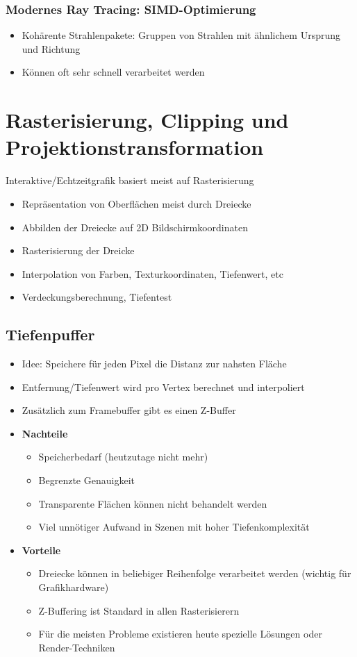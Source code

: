 \subsubsection{Modernes Ray Tracing: SIMD-Optimierung}
\begin{itemize}
	\item Kohärente Strahlenpakete: Gruppen von Strahlen mit ähnlichem Ursprung und Richtung
	\item Können oft sehr schnell verarbeitet werden
\end{itemize}



\section{Rasterisierung, Clipping und Projektionstransformation}
Interaktive/Echtzeitgrafik basiert meist auf Rasterisierung
\begin{itemize}
	\item Repräsentation von Oberflächen meist durch Dreiecke
	\item Abbilden der Dreiecke auf 2D Bildschirmkoordinaten
	\item Rasterisierung der Dreicke
	\item Interpolation von Farben, Texturkoordinaten, Tiefenwert, etc
	\item Verdeckungsberechnung, Tiefentest
\end{itemize}


\subsection{Tiefenpuffer}
\begin{itemize}
	\item Idee: Speichere für jeden Pixel die Distanz zur nahsten Fläche
	\item Entfernung/Tiefenwert wird pro Vertex berechnet und interpoliert
	\item Zusätzlich zum Framebuffer gibt es einen Z-Buffer
	\item \textbf{Nachteile}
	\begin{itemize}
		\item Speicherbedarf (heutzutage nicht mehr)
		\item Begrenzte Genauigkeit
		\item Transparente Flächen können nicht behandelt werden
		\item Viel unnötiger Aufwand in Szenen mit hoher Tiefenkomplexität
	\end{itemize}
	\item \textbf{Vorteile}
	\begin{itemize}
		\item Dreiecke können in beliebiger Reihenfolge verarbeitet werden (wichtig für Grafikhardware)
		\item Z-Buffering ist Standard in allen Rasterisierern
		\item Für die meisten Probleme existieren heute spezielle Lösungen oder Render-Techniken
	\end{itemize}
\end{itemize}


